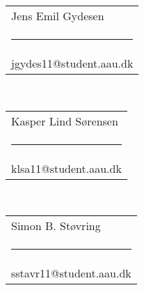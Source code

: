 \newcommand{\signature}[3][5cm]{%
  \begin{tabular}{@{}p{#1}@{}}
    #2 \\[2\normalbaselineskip] \hrule \\[0pt]
    {\small #3} \\[2\normalbaselineskip]
  \end{tabular}
}

\centering
\signature{Jens Emil Gydesen}{jgydes11@student.aau.dk}
\\ \vspace{2cm}
\signature{Kasper Lind Sørensen}{klsa11@student.aau.dk}
\\ \vspace{2cm}
\signature{Simon B. Støvring}{sstavr11@student.aau.dk}

